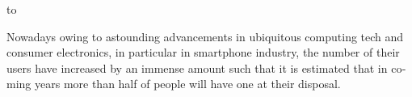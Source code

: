 \newpage
\vspace*{45mm}
\begin{latin}
\thispagestyle{empty}
\hbox to 
\vspace*{10mm}
Nowadays owing to astounding advancements in ubiquitous computing tech and consumer electronics, in particular in smartphone industry, the number of their
users have increased by an immense amount such that it is estimated that in coming years more than half of people will have one at their disposal.
\end{latin}

